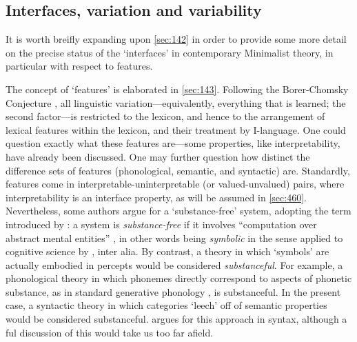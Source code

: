 \subsection{Interfaces, variation and variability}\label{sec:150}

It is worth breifly expanding upon \autoref{sec:142} in order to provide some more detail on the precise status of the `interfaces' in contemporary Minimalist theory, in particular with respect to features.

The concept of `features' is elaborated in \autoref{sec:143}. Following the Borer-Chomsky Conjecture \parencite{BakerMC_2008}, all linguistic variation---equivalently, everything that is learned; the second factor---is restricted to the lexicon, and hence to the arrangement of lexical features within the lexicon, and their treatment by I-language. One could question exactly what these features are---some properties, like interpretability, have already been discussed. One may further question how distinct the difference sets of features (phonological, semantic, and syntactic) are. Standardly, features come in interpretable-uninterpretable (or valued-unvalued) pairs, where interpretability is an interface property, as will be assumed in \autoref{sec:460}. Nevertheless, some authors argue for a `substance-free' system, adopting the term introduced by \textcite{HaleM.ReissC_2008}: a system is \textit{substance-free} if it involves ``computation over abstract mental entities'' \parencite[22]{HaleM.ReissC_2008}, in other words being \textit{symbolic} in the sense applied to cognitive science by \textcite{PylyshynZW_1984,GallistelCR_2001,GallistelCR.KingAP_2010}, inter alia. By contrast, a theory in which `symbols' are actually embodied in percepts would be considered \textit{substanceful}. For example, a phonological theory in which phonemes directly correspond to aspects of phonetic substance, as in standard generative phonology \parencite{ChomskyN.HalleM_1968}, is substanceful. In the present case, a syntactic theory in which categories `leech' off of semantic properties would be considered substanceful. \textcite{ZeijlstraH_2014} argues for this approach in syntax, although a ful discussion of this would take us too far afield.

